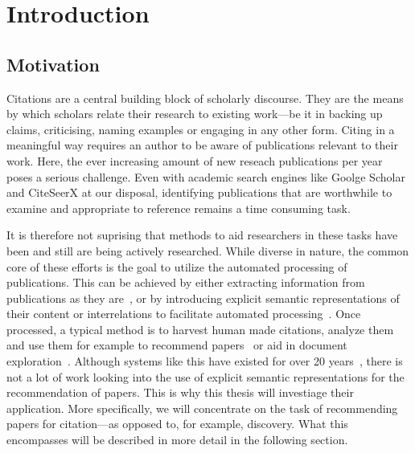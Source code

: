 \chapter{Introduction}\label{chap:introduction}
\section{Motivation}
Citations are a central building block of scholarly discourse. They are the means by which scholars relate their research to existing work---be it in backing up claims, criticising, naming examples or engaging in any other form. Citing in a meaningful way requires an author to be aware of publications relevant to their work.
Here, the ever increasing amount of new reseach publications per year poses a serious challenge. Even with academic search engines like Goolge Scholar and CiteSeerX at our disposal, identifying publications that are worthwhile to examine and appropriate to reference remains a time consuming task.

It is therefore not suprising that methods to aid researchers in these tasks have been and still are being actively researched. While diverse in nature, the common core of these efforts is the goal to utilize the automated processing of publications. This can be achieved by either extracting information from publications as they are~\cite{Nasar2018,Beel2016}, or by introducing explicit semantic representations of their content or interrelations to facilitate automated processing~\cite{BuckinghamShum2000,Schneider2013,Jaradeh2019}. Once processed, a typical method is to harvest human made citations, analyze them~\cite{Abujbara2013,Teufel2006a} and use them for example to recommend papers~\cite{Beel2016} or aid in document exploration~\cite{Berger2016}. Although systems like this have existed for over 20 years~\cite{Bollacker1998,Beel2016}, there is not a lot of work looking into the use of explicit semantic representations for the recommendation of papers.
This is why this thesis will investiage their application. More specifically, we will concentrate on the task of recommending papers for citation---as opposed to, for example, discovery. What this encompasses will be described in more detail in the following section.


